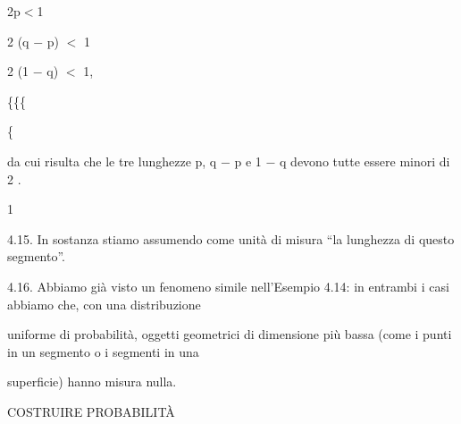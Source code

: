 \documentclass[a4paper,portrait,12pt]{article}
\begin{document}
\begin{flushleft}
2p$<$1
\end{flushleft}


\begin{flushleft}
2 (q $-$ p) $<$ 1
\end{flushleft}


\begin{flushleft}
2 (1 $-$ q) $<$ 1,
\end{flushleft}





\{\{\{


\{





\begin{flushleft}
da cui risulta che le tre lunghezze p, q $-$ p e 1 $-$ q devono tutte essere minori di 2 .
\end{flushleft}


1





\begin{flushleft}
4.15. In sostanza stiamo assumendo come unit\`{a} di misura ``la lunghezza di questo segmento''.
\end{flushleft}


\begin{flushleft}
4.16. Abbiamo gi\`{a} visto un fenomeno simile nell'Esempio 4.14: in entrambi i casi abbiamo che, con una distribuzione
\end{flushleft}


\begin{flushleft}
uniforme di probabilit\`{a}, oggetti geometrici di dimensione più bassa (come i punti in un segmento o i segmenti in una
\end{flushleft}


\begin{flushleft}
superficie) hanno misura nulla.
\end{flushleft}










\begin{flushleft}
COSTRUIRE PROBABILIT\`{A}
\end{flushleft}
\end{document}
